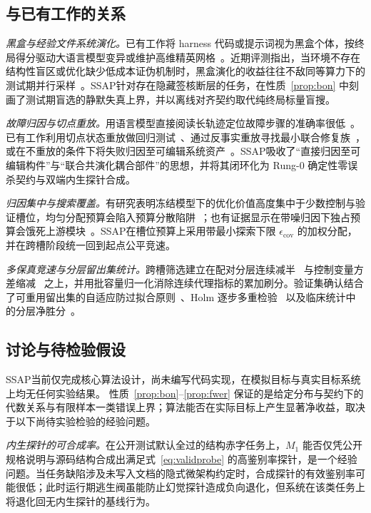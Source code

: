 \documentclass[UTF8,a4paper,10.5pt]{ctexart}
\newcommand{\method}{SSAP}
\begin{document}
\subsection{与已有工作的关系}
\label{sec:related}

\emph{黑盒与经验文件系统演化。}已有工作将 harness 代码或提示词视为黑盒个体，按终局得分驱动大语言模型变异或维护高维精英网格~\cite{vero,hob,metaharness}。近期评测指出，当环境不存在结构性盲区或优化缺少低成本证伪机制时，黑盒演化的收益往往不敌同等算力下的测试期并行采样~\cite{rethinking}。\method{}针对存在隐藏签核断层的任务，在性质~\ref{prop:bon} 中刻画了测试期盲选的静默失真上界，并以离线对齐契约取代纯终局标量盲搜。

\emph{故障归因与切点重放。}用语言模型直接阅读长轨迹定位故障步骤的准确率很低~\cite{whowhen}。已有工作利用切点状态重放做回归测试~\cite{chronicle}、通过反事实重放寻找最小联合修复族~\cite{gcjr}，或在不重放的条件下将失败归因至可编辑系统资产~\cite{daaf}。\method{}吸收了“直接归因至可编辑构件”与“联合共演化耦合部件”的思想，并将其闭环化为 Rung-0 确定性零误杀契约与双端内生探针合成。

\emph{归因集中与搜索覆盖。}有研究表明冻结模型下的优化价值高度集中于少数控制与验证槽位，均匀分配预算会陷入预算分散陷阱~\cite{harnessevo}；也有证据显示在带噪归因下独占预算会饿死上游模块~\cite{coverage}。\method{}在槽位预算上采用带最小探索下限 $\epsilon_{\mathrm{cov}}$ 的加权分配，并在跨槽阶段统一回到起点公平竞速。

\emph{多保真竞速与分层留出集统计。}跨槽筛选建立在配对分层连续减半~\cite{sha} 与控制变量方差缩减~\cite{cuped} 之上，并用批容量归一化消除连续代理指标的累加刷分。验证集确认结合了可重用留出集的自适应防过拟合原则~\cite{dwork2015}、Holm 逐步多重检验~\cite{holm} 以及临床统计中的分层净胜分~\cite{fs1999,pocock2012}。

\subsection{讨论与待检验假设}
\label{sec:discussion}

\method{}当前仅完成核心算法设计，尚未编写代码实现，在模拟目标与真实目标系统上均无任何实验结果。
性质~\ref{prop:bon}--\ref{prop:fwer} 保证的是给定分布与契约下的代数关系与有限样本一类错误上界；算法能否在实际目标上产生显著净收益，取决于以下尚待实验检验的经验问题。

\emph{内生探针的可合成率。}在公开测试默认全过的结构赤字任务上，$M_1$ 能否仅凭公开规格说明与源码结构合成出满足式~\eqref{eq:validprobe} 的高鉴别率探针，是一个经验问题。当任务缺陷涉及未写入文档的隐式微架构约定时，合成探针的有效鉴别率可能很低；此时运行期逃生阀虽能防止幻觉探针造成负向退化，但系统在该类任务上将退化回无内生探针的基线行为。
\end{document}
